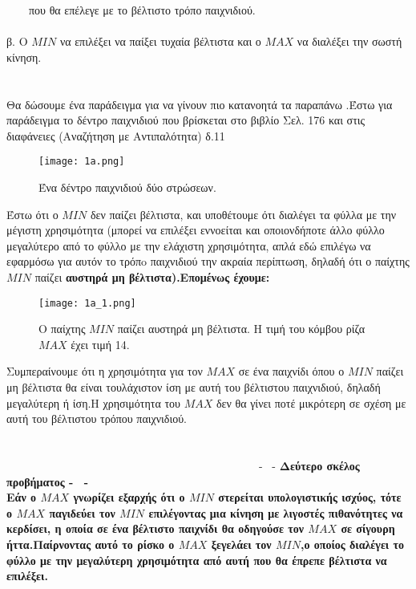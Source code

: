 \documentclass[10pt]{article}
\begin{document}
\ \ \ \ που θα επέλεγε με το βέλτιστο τρόπο παιχνιδιού. \\ \\

β. Ο  $MIN$  να επιλέξει να παίξει τυχαία βέλτιστα και ο $MAX$ να διαλέξει την σωστή κίνηση. \\ \\ \\

Θα δώσουμε ένα παράδειγμα για να γίνουν πιο κατανοητά τα παραπάνω .Έστω για παράδειγμα το δέντρο παιχνιδιού που βρίσκεται στο βιβλίο Σελ. 176 και στις διαφάνειες (Αναζήτηση με Αντιπαλότητα) δ.11

\begin{figure}[H]
    \texttt{[image: 1a.png]}\\
    \caption{Ένα δέντρο παιχνιδιού δύο στρώσεων.}
\end{figure} 

Έστω ότι ο $MIN$ δεν παίζει βέλτιστα, και υποθέτουμε ότι διαλέγει τα φύλλα με την μέγιστη χρησιμότητα (μπορεί να επιλέξει εννοείται και οποιονδήποτε άλλο φύλλο μεγαλύτερο από το φύλλο με την ελάχιστη χρησιμότητα, απλά εδώ επιλέγω να εφαρμόσω για αυτόν το τρόπo παιχνιδιού την ακραία περίπτωση, δηλαδή ότι ο παίχτης $MIN$ παίζει \bf αυστηρά μη βέλτιστα\normalfont).Επομένως έχουμε:
\begin{figure}[H]
    \texttt{[image: 1a\_1.png]}\\
    \caption{Ο παίχτης $MIN$ παίζει αυστηρά μη βέλτιστα. Η τιμή του κόμβου ρίζα $MAX$ έχει τιμή 14.}
\end{figure} 

Συμπεραίνουμε ότι η χρησιμότητα για τον $MAX$ σε ένα παιχνίδι όπου ο $MIN$ παίζει μη βέλτιστα θα είναι τουλάχιστον ίση με αυτή του βέλτιστου παιχνιδιού, δηλαδή μεγαλύτερη ή ίση.Η χρησιμότητα του $MAX$ δεν θα γίνει ποτέ μικρότερη σε σχέση με αυτή του βέλτιστου τρόπου παιχνιδιού. \\ \\ \\ 

\ \ \ \ \ \ \ \ \ \ \ \ \ \ \ \ 
\ \ \ \ \ \ \ \ \ \ \ \ \ \ \ \
\ \ \ \ \ \ \ \ \ \ \ \ \ - \ - \bf   Δεύτερο σκέλος προβήματος \normalfont - \ - \\

Εάν ο $MAX$ γνωρίζει εξαρχής ότι ο $MIN$ στερείται υπολογιστικής ισχύος, τότε ο $MAX$  παγιδεύει τον $MIN$ επιλέγοντας μια κίνηση με λιγοστές πιθανότητες να κερδίσει, η οποία σε ένα βέλτιστο παιχνίδι θα οδηγούσε τον $MAX$ σε σίγουρη \bf ήττα.\normalfont Παίρνοντας αυτό το ρίσκο ο $MAX$ ξεγελάει τον $MIN$,ο οποίος διαλέγει το φύλλο με την μεγαλύτερη χρησιμότητα από αυτή που θα έπρεπε βέλτιστα να επιλέξει.\ \\ \\
\end{document}
